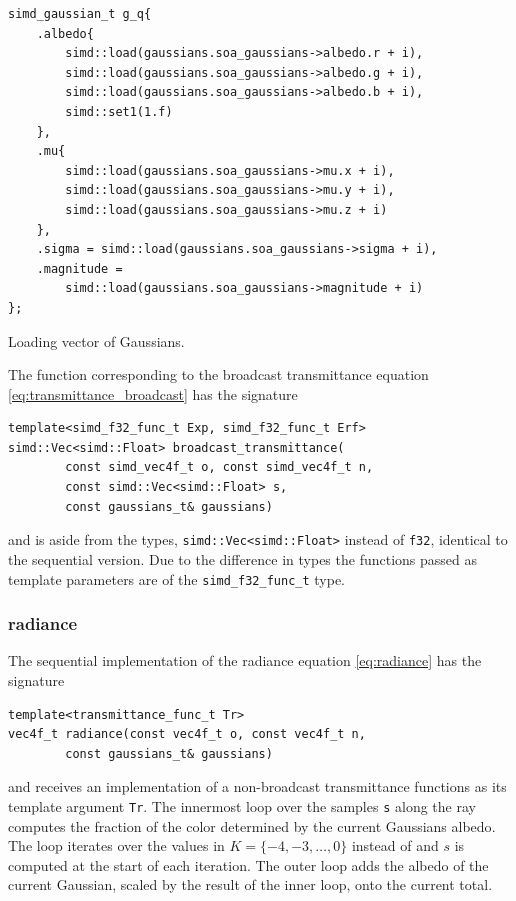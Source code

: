 \documentclass[a4paper, 11pt]{memoir}
\begin{document}
    \begin{listing}[t]
        \begin{verbatim}
simd_gaussian_t g_q{
    .albedo{
        simd::load(gaussians.soa_gaussians->albedo.r + i),
        simd::load(gaussians.soa_gaussians->albedo.g + i),
        simd::load(gaussians.soa_gaussians->albedo.b + i),
        simd::set1(1.f)
    },
    .mu{
        simd::load(gaussians.soa_gaussians->mu.x + i),
        simd::load(gaussians.soa_gaussians->mu.y + i),
        simd::load(gaussians.soa_gaussians->mu.z + i)
    },
    .sigma = simd::load(gaussians.soa_gaussians->sigma + i),
    .magnitude =
        simd::load(gaussians.soa_gaussians->magnitude + i)
};
        \end{verbatim}
        \caption{Loading vector of Gaussians.}
        \label{lst:gaussian_load}
    \end{listing}

    The function corresponding to the broadcast \gls{transmittance} equation \eqref{eq:transmittance_broadcast} has the
    signature
    \begin{verbatim}
template<simd_f32_func_t Exp, simd_f32_func_t Erf>
simd::Vec<simd::Float> broadcast_transmittance(
        const simd_vec4f_t o, const simd_vec4f_t n,
        const simd::Vec<simd::Float> s,
        const gaussians_t& gaussians)
    \end{verbatim}
    and is aside from the types, \texttt{simd::Vec<simd::Float>} instead of \texttt{f32}, identical
    to the sequential version. Due to the difference in types the functions passed as template parameters are of the
    \texttt{simd_f32_func_t} type.
    
    \subsubsection{\gls{radiance}}
    The sequential implementation of the \gls{radiance} equation \eqref{eq:radiance} has the signature
    \begin{verbatim}
template<transmittance_func_t Tr>
vec4f_t radiance(const vec4f_t o, const vec4f_t n,
        const gaussians_t& gaussians)
    \end{verbatim}
    and receives an implementation of a non-broadcast \gls{transmittance} functions as its template argument
    \texttt{Tr}. The innermost loop over the samples \texttt{s} along the ray computes the fraction
    of the color determined by the current Gaussians \gls{albedo}. The loop iterates over the values in
    $K = \{-4, -3, \dots, 0\}$ instead of and $s$ is computed at the start of each iteration. The outer loop adds the
    \gls{albedo} of the current Gaussian, scaled by the result of the inner loop, onto the current total.
    
\end{document}
